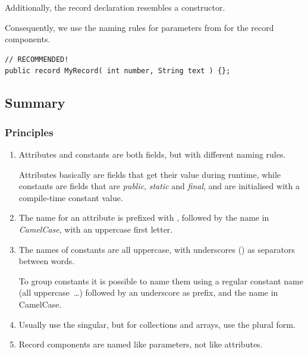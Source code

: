 Additionally, the record declaration resembles a constructor.

Consequently, we use the naming rules for parameters from  for the record components.
\begin{lstlisting}
// RECOMMENDED!
public record MyRecord( int number, String text ) {};
\end{lstlisting}


\subsection{Summary}

\subsubsection{Principles}
\begin{enumerate}[label=P\arabic*.]
	\item{Attributes and constants are both fields, but with different naming rules.
	
	Attributes basically are fields that get their value during runtime, while constants are fields that are \textit{public}, \textit{static} and \textit{final}, and are initialised with a compile-time constant value.}
	
	\item{The name for an attribute is prefixed with , followed by the name in \textit{CamelCase}, with an uppercase first letter.}

	\item{The names of constants are all uppercase, with underscores (\bdq{\texttt{\_}}) as separators between words.
	
	To group constants it is possible to name them using a regular constant name (all uppercase~…) followed by an underscore as prefix, and the name in CamelCase.}
	
	\item{Usually use the singular, but for collections and arrays, use the plural form.}
	
	\item{Record components are named like parameters, not like attributes.}
\end{enumerate}

